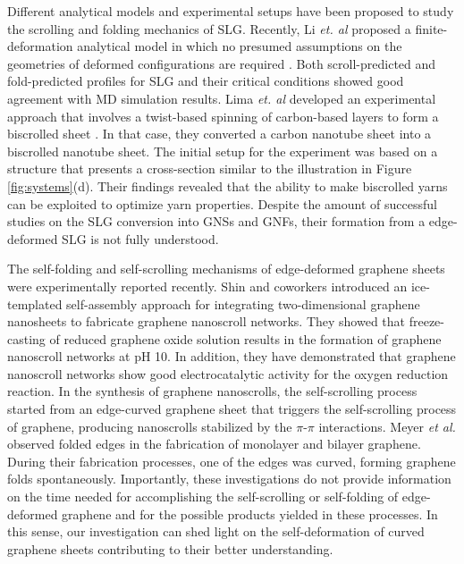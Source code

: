 \documentclass[twoside,twocolumn,9pt]{article}
\begin{document}
Different analytical models \cite{li2018mechanics,cox2015relating} and experimental setups \cite{lima2011biscrolling} have been proposed to study the scrolling and folding mechanics of SLG. Recently, Li \textit{et. al} proposed a finite-deformation analytical model in which no presumed assumptions on the geometries of deformed configurations are required \cite{li2018mechanics}. Both scroll-predicted and fold-predicted profiles for SLG and their critical conditions showed good agreement with MD simulation results. Lima \textit{et. al} developed an experimental approach that involves a twist-based spinning of carbon-based layers to form a biscrolled sheet \cite{lima2011biscrolling}. In that case, they converted a carbon nanotube sheet into a biscrolled nanotube sheet. The initial setup for the experiment was based on a structure that presents a cross-section similar to the illustration in Figure \ref{fig:systems}(d). Their findings revealed that the ability to make biscrolled yarns can be exploited to optimize yarn properties. Despite the amount of successful studies on the SLG conversion into GNSs and GNFs, their formation from a edge-deformed SLG is not fully understood.   

The self-folding \cite{shinNANOSCALE_2014} and self-scrolling \cite{meyerNATURE_2007} mechanisms of edge-deformed graphene sheets were experimentally reported recently. Shin and coworkers \cite{shinNANOSCALE_2014} introduced an ice-templated self-assembly approach for integrating two-dimensional graphene nanosheets to fabricate graphene nanoscroll networks. They showed that freeze-casting of reduced graphene oxide solution results in the formation of graphene nanoscroll networks at pH 10. In addition, they have demonstrated that graphene nanoscroll networks show good electrocatalytic activity for the oxygen reduction reaction. In the synthesis of graphene nanoscrolls, the self-scrolling process started from an edge-curved graphene sheet that triggers the self-scrolling process of graphene, producing nanoscrolls stabilized by the $\pi$-$\pi$ interactions. Meyer \textit{et al.} \cite{meyerNATURE_2007} observed folded edges in the fabrication of monolayer and bilayer graphene. During their fabrication processes, one of the edges was curved, forming graphene folds spontaneously. Importantly, these investigations do not provide information on the time needed for accomplishing the self-scrolling or self-folding of edge-deformed graphene and for the possible products yielded in these processes. In this sense, our investigation can shed light on the self-deformation of curved graphene sheets contributing to their better understanding.
\end{document}
